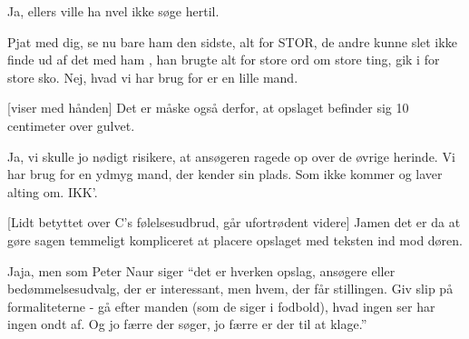 \documentclass[a4paper,11pt]{article}
\begin{document}
\begin{sketch}
   Ja, ellers ville ha nvel ikke søge hertil.

   Pjat med dig, se nu bare ham den sidste, alt for STOR, de
  andre kunne slet ikke finde ud af det med ham ,
  han brugte alt for store ord om store ting, gik i for store sko.
  Nej, hvad vi har brug for er en lille mand.

  [viser med hånden] Det er måske også derfor, at opslaget
  befinder sig 10 centimeter over gulvet.

   Ja, vi skulle jo nødigt risikere, at ansøgeren ragede op
  over de øvrige herinde.  Vi har brug for en ydmyg mand, der kender
  sin plads.  Som ikke kommer og laver alting om. IKK'.

  [Lidt betyttet over C's følelsesudbrud, går ufortrødent
  videre] Jamen det er da at gøre sagen temmeligt kompliceret at
  placere opslaget med teksten ind mod døren.

   Jaja, men som Peter Naur siger "`det er hverken opslag,
  ansøgere eller bedømmelsesudvalg, der er interessant, men hvem, der
  får stillingen.  Giv slip på formaliteterne - gå efter manden (som
  de siger i fodbold), hvad ingen ser har ingen ondt af.  Og jo færre
  der søger, jo færre er der til at klage."'


\end{sketch}
\end{document}
